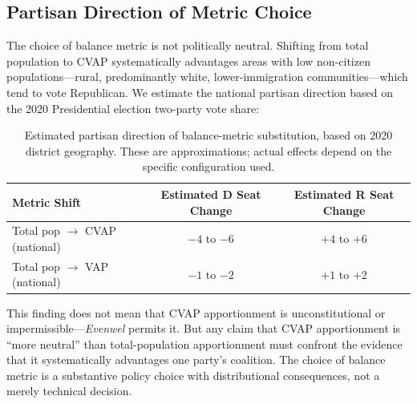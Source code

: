 \subsection{Partisan Direction of Metric Choice}

The choice of balance metric is not politically neutral. Shifting from total population to CVAP systematically advantages areas with low non-citizen populations---rural, predominantly white, lower-immigration communities---which tend to vote Republican. We estimate the national partisan direction based on the 2020 Presidential election two-party vote share:

\begin{table}[h]
\centering
\begin{tabular}{lcc}
\toprule
\textbf{Metric Shift} & \textbf{Estimated D Seat Change} & \textbf{Estimated R Seat Change} \\
\midrule
Total pop $\to$ CVAP (national) & $-4$ to $-6$ & $+4$ to $+6$ \\
Total pop $\to$ VAP (national) & $-1$ to $-2$ & $+1$ to $+2$ \\
\bottomrule
\end{tabular}
\caption{Estimated partisan direction of balance-metric substitution, based on 2020 district geography. These are approximations; actual effects depend on the specific configuration used.}
\label{tab:partisan}
\end{table}

This finding does not mean that CVAP apportionment is unconstitutional or impermissible---\emph{Evenwel} permits it. But any claim that CVAP apportionment is ``more neutral'' than total-population apportionment must confront the evidence that it systematically advantages one party's coalition. The choice of balance metric is a substantive policy choice with distributional consequences, not a merely technical decision.
